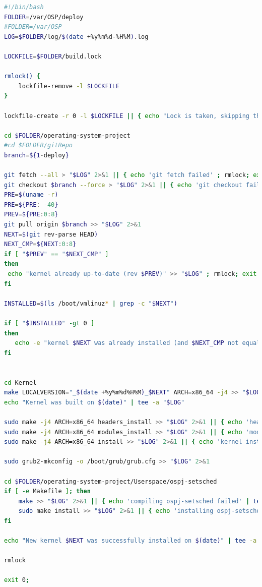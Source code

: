 \documentclass[]{report}
\begin{document}
\begin{lstlisting}[language=bash, style=code, caption=/var/OSP/deploy/script/build.sh]
#!/bin/bash
FOLDER=/var/OSP/deploy
#FOLDER=/var/OSP
LOG=$FOLDER/log/$(date +%y%m%d-%H%M).log

LOCKFILE=$FOLDER/build.lock

rmlock() {
    lockfile-remove -l $LOCKFILE
}

lockfile-create -r 0 -l $LOCKFILE || { echo "Lock is taken, skipping the build" ; exit 99;}

cd $FOLDER/operating-system-project
#cd $FOLDER/gitRepo
branch=${1-deploy}

git fetch --all > "$LOG" 2>&1 || { echo 'git fetch failed' ; rmlock; exit 1; }
git checkout $branch --force > "$LOG" 2>&1 || { echo 'git checkout failed' ; rmlock; exit 1; }
PRE=$(uname -r)
PRE=${PRE: -40}
PREV=${PRE:0:8}
git pull origin $branch >> "$LOG" 2>&1 
NEXT=$(git rev-parse HEAD)
NEXT_CMP=${NEXT:0:8}
if [ "$PREV" == "$NEXT_CMP" ]
then
 echo "kernel already up-to-date (rev $PREV)" >> "$LOG" ; rmlock; exit 2;
fi

INSTALLED=$(ls /boot/vmlinuz* | grep -c "$NEXT")

if [ "$INSTALLED" -gt 0 ]
then
   echo -e "kernel $NEXT was already installed (and $NEXT_CMP not equal to $PREV)\nhttps://gitlab.tubit.tu-berlin.de/mirko/operating-system-project/commit/$NEXT_CMP\nhttps://gitlab.tubit.tu-berlin.de/mirko/operating-system-project/commit/$PREV" | tee -a  "$LOG" ; rmlock; exit 3;
fi


cd Kernel
make LOCALVERSION="_$(date +%y%m%d%H%M)_$NEXT" ARCH=x86_64 -j4 >> "$LOG" 2>&1 || { echo 'kernel compilation failed' | tee -a "$LOG"; rmlock; exit 4; }
echo "Kernel was built on $(date)" | tee -a "$LOG"

sudo make -j4 ARCH=x86_64 headers_install >> "$LOG" 2>&1 || { echo 'header installation failed' | tee -a "$LOG"; rmlock; exit 5; }
sudo make -j4 ARCH=x86_64 modules_install >> "$LOG" 2>&1 || { echo 'module installation failed' | tee -a "$LOG"; rmlock; exit 6; }
sudo make -j4 ARCH=x86_64 install >> "$LOG" 2>&1 || { echo 'kernel installation failed' | tee -a "$LOG"; rmlock; exit 7; }

sudo grub2-mkconfig -o /boot/grub/grub.cfg >> "$LOG" 2>&1

cd $FOLDER/operating-system-project/Userspace/ospj-setsched
if [ -e Makefile ]; then
    make >> "$LOG" 2>&1 || { echo 'compiling ospj-setsched failed' | tee -a "$LOG"; rmlock; exit 8; }
    sudo make install >> "$LOG" 2>&1 || { echo 'installing ospj-setsched failed' | tee -a "$LOG"; rmlock; exit 9; }
fi

echo "New kernel $NEXT was successfully installed on $(date)" | tee -a "$LOG"

rmlock

exit 0;
\end{lstlisting}
\end{document}
